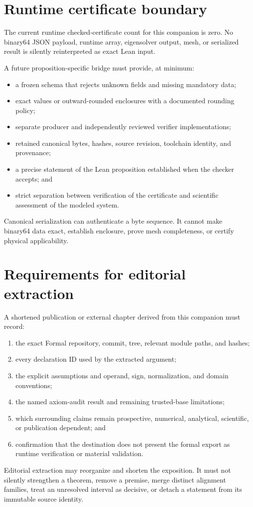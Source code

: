 \section{Runtime certificate boundary}

The current runtime checked-certificate count for this companion is zero. No binary64
JSON payload, runtime array, eigensolver output, mesh, or serialized result is silently
reinterpreted as exact Lean input.

A future proposition-specific bridge must provide, at minimum:

\begin{itemize}
  \item a frozen schema that rejects unknown fields and missing mandatory data;
  \item exact values or outward-rounded enclosures with a documented rounding policy;
  \item separate producer and independently reviewed verifier implementations;
  \item retained canonical bytes, hashes, source revision, toolchain identity, and
        provenance;
  \item a precise statement of the Lean proposition established when the checker
        accepts; and
  \item strict separation between verification of the certificate and scientific
        assessment of the modeled system.
\end{itemize}

Canonical serialization can authenticate a byte sequence. It cannot make binary64 data
exact, establish enclosure, prove mesh completeness, or certify physical applicability.

\section{Requirements for editorial extraction}

A shortened publication or external chapter derived from this companion must record:

\begin{enumerate}
  \item the exact Formal repository, commit, tree, relevant module paths, and hashes;
  \item every declaration ID used by the extracted argument;
  \item the explicit assumptions and operand, sign, normalization, and domain
        conventions;
  \item the named axiom-audit result and remaining trusted-base limitations;
  \item which surrounding claims remain prospective, numerical, analytical,
        scientific, or publication dependent; and
  \item confirmation that the destination does not present the formal export as runtime
        verification or material validation.
\end{enumerate}

Editorial extraction may reorganize and shorten the exposition. It must not silently
strengthen a theorem, remove a premise, merge distinct alignment families, treat an
unresolved interval as decisive, or detach a statement from its immutable source
identity.
